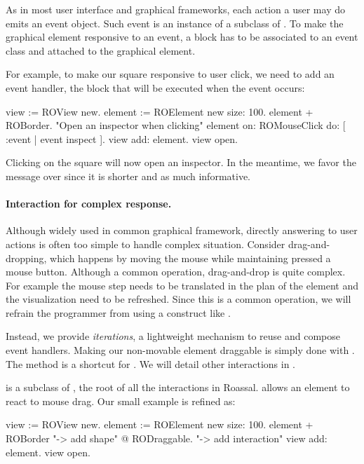 \documentclass[a4paper,10pt,twoside]{book}
\begin{document}
As in most user interface and graphical frameworks, each action a user may do emits an event object. Such event is an instance of a subclass of . To make the graphical element responsive to an event, a block has to be associated to an event class and attached to the graphical element.

For example, to make our square responsive to user click, we need to add an event handler, \ie the block that will be executed when the event occurs:

\begin{code}{}
view := ROView new.
element := ROElement new size: 100.
element + ROBorder. 
"Open an inspector when clicking"
element on: ROMouseClick do: [ :event | event inspect ]. 
view add: element.
view open.
\end{code}

Clicking on the square will now open an inspector. In the meantime, we favor the message \ct{+} over  since it is shorter and as much informative.

\paragraph{Interaction for complex response.}
Although widely used in common graphical framework, directly answering to user actions is often too simple to handle complex situation. Consider drag-and-dropping, which happens by moving the mouse while maintaining pressed a mouse button. Although a common operation, drag-and-drop is quite complex. For example the mouse step needs to be translated in the plan of the element and the visualization need to be refreshed. Since this is a common operation, we will refrain the programmer from using a construct like .

Instead, we provide \emph{iterations}, a lightweight mechanism to reuse and compose event handlers. Making our non-movable element draggable is simply done with . The  method is a shortcut for . We will detail other interactions in .

 is a subclass of , the root of all the interactions in Roassal.  allows an element to react to mouse drag. Our small example is refined as:

\begin{code}{}
view := ROView new.
element := ROElement new size: 100.
element 
	+ ROBorder "-> add shape"
	@ RODraggable. "-> add interaction"
view add: element.
view open.
\end{code}
\end{document}
